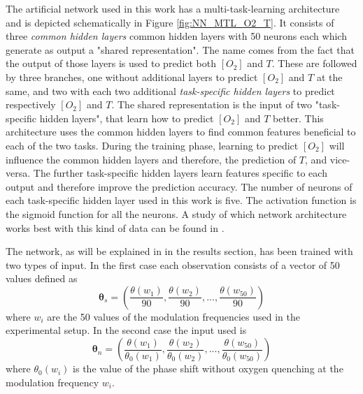 \documentclass[9pt,twocolumn,twoside,pdftex]{optica}
\begin{document}
The artificial network used in this work has a multi-task-learning architecture and is depicted schematically in Figure \ref{fig:NN_MTL_O2_T}. It consists of three {\sl common hidden layers} common hidden layers with 50 neurons each which generate as output a "shared representation". The name comes from the fact that the output of those layers is used to predict both $[O_2]$ and $T$. These are followed by three branches, one without additional layers to predict $[O_2]$ and $T$ at the same, and two with each two additional {\sl task-specific hidden layers} to predict respectively $[O_2]$ and $T$. The shared representation is the input of two "task-specific hidden layers", that learn how to predict $[O_2]$ and $T$ better. This architecture uses the common hidden layers to find common features beneficial to each of the two tasks. During the training phase, learning to predict $[O_2]$ will influence the common hidden layers and therefore, the prediction of $T$, and vice-versa. The further task-specific hidden layers learn features specific to each output and therefore improve the prediction accuracy. The number of neurons of each task-specific hidden layer used in this work is five. The activation function is the sigmoid function for all the neurons.  A study of which network architecture works best with this kind of data can be found in \cite{Michelucci2019_2}.

The network, as will be explained in in the results section, has been trained with two types of input. In the first case each observation consists of a vector of 50 values defined as
\begin{equation}
\label{input1}
{\pmb \theta}_s = \left(
\frac{\theta(w_1)}{90} , \frac{\theta(w_2)}{90} , ..., \frac{\theta(w_{50})}{90} 
\right)
\end{equation}
where $w_i$ are the 50 values of the modulation frequencies used in the experimental setup.
In the second case the input used is
\begin{equation}
\label{input2}
{\pmb \theta}_n = \left(
\frac{\theta(w_1)}{\theta_0(w_1)} , \frac{\theta(w_2)}{\theta_0(w_2)} , ..., \frac{\theta(w_{50})}{\theta_0(w_{50})} 
\right)
\end{equation}
where $\theta_0(w_i)$ is the value of the phase shift without oxygen quenching at the modulation frequency $w_i$.
\end{document}
